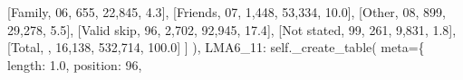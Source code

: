 \documentclass[
  11pt,
  a4paper,
]{article}
\newenvironment{Shaded}{\begin{snugshade}}{\end{snugshade}}
\newcommand{\NormalTok}[1]{\textcolor[rgb]{0.00,0.23,0.31}{#1}}
\newcommand{\OperatorTok}[1]{\textcolor[rgb]{0.37,0.37,0.37}{#1}}
\newcommand{\StringTok}[1]{\textcolor[rgb]{0.13,0.47,0.30}{#1}}
\newcommand{\VariableTok}[1]{\textcolor[rgb]{0.07,0.07,0.07}{#1}}
\begin{document}
\begin{Shaded}
\begin{Highlighting}[]
\NormalTok{                    [}\StringTok{\textquotesingle{}Family\textquotesingle{}}\NormalTok{, }\StringTok{\textquotesingle{}06\textquotesingle{}}\NormalTok{, }\StringTok{\textquotesingle{}655\textquotesingle{}}\NormalTok{, }\StringTok{\textquotesingle{}22,845\textquotesingle{}}\NormalTok{, }\StringTok{\textquotesingle{}4.3\textquotesingle{}}\NormalTok{],}
\NormalTok{                    [}\StringTok{\textquotesingle{}Friends\textquotesingle{}}\NormalTok{, }\StringTok{\textquotesingle{}07\textquotesingle{}}\NormalTok{, }\StringTok{\textquotesingle{}1,448\textquotesingle{}}\NormalTok{, }\StringTok{\textquotesingle{}53,334\textquotesingle{}}\NormalTok{, }\StringTok{\textquotesingle{}10.0\textquotesingle{}}\NormalTok{],}
\NormalTok{                    [}\StringTok{\textquotesingle{}Other\textquotesingle{}}\NormalTok{, }\StringTok{\textquotesingle{}08\textquotesingle{}}\NormalTok{, }\StringTok{\textquotesingle{}899\textquotesingle{}}\NormalTok{, }\StringTok{\textquotesingle{}29,278\textquotesingle{}}\NormalTok{, }\StringTok{\textquotesingle{}5.5\textquotesingle{}}\NormalTok{],}
\NormalTok{                    [}\StringTok{\textquotesingle{}Valid skip\textquotesingle{}}\NormalTok{, }\StringTok{\textquotesingle{}96\textquotesingle{}}\NormalTok{, }\StringTok{\textquotesingle{}2,702\textquotesingle{}}\NormalTok{, }\StringTok{\textquotesingle{}92,945\textquotesingle{}}\NormalTok{, }\StringTok{\textquotesingle{}17.4\textquotesingle{}}\NormalTok{],}
\NormalTok{                    [}\StringTok{\textquotesingle{}Not stated\textquotesingle{}}\NormalTok{, }\StringTok{\textquotesingle{}99\textquotesingle{}}\NormalTok{, }\StringTok{\textquotesingle{}261\textquotesingle{}}\NormalTok{, }\StringTok{\textquotesingle{}9,831\textquotesingle{}}\NormalTok{, }\StringTok{\textquotesingle{}1.8\textquotesingle{}}\NormalTok{],}
\NormalTok{                    [}\StringTok{\textquotesingle{}Total\textquotesingle{}}\NormalTok{, }\StringTok{\textquotesingle{}\textquotesingle{}}\NormalTok{, }\StringTok{\textquotesingle{}16,138\textquotesingle{}}\NormalTok{, }\StringTok{\textquotesingle{}532,714\textquotesingle{}}\NormalTok{, }\StringTok{\textquotesingle{}100.0\textquotesingle{}}\NormalTok{]}
\NormalTok{                ]}
\NormalTok{            ),}
            \StringTok{\textquotesingle{}LMA6\_11\textquotesingle{}}\NormalTok{: }\VariableTok{self}\NormalTok{.\_create\_table(}
\NormalTok{                meta}\OperatorTok{=}\NormalTok{\{}
                    \StringTok{\textquotesingle{}length\textquotesingle{}}\NormalTok{: }\StringTok{\textquotesingle{}1.0\textquotesingle{}}\NormalTok{, }\StringTok{\textquotesingle{}position\textquotesingle{}}\NormalTok{: }\StringTok{\textquotesingle{}96\textquotesingle{}}\NormalTok{,}

\end{Highlighting}
\end{Shaded}
\end{document}

